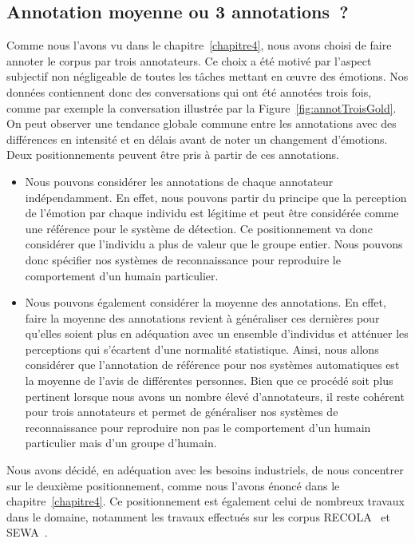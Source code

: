 \subsection{Annotation moyenne ou 3 annotations ?}
Comme nous l'avons vu dans le chapitre~\ref{chapitre4}, nous avons choisi de faire annoter le corpus par trois annotateurs. Ce choix a été motivé par l'aspect subjectif non négligeable de toutes les tâches mettant en œuvre des émotions. Nos données contiennent donc des conversations qui ont été annotées trois fois, comme par exemple la conversation illustrée par la Figure~\ref{fig:annotTroisGold}. On peut observer une tendance globale commune entre les annotations avec des différences en intensité et en délais avant de noter un changement d'émotions. Deux positionnements peuvent être pris à partir de ces annotations.



\begin{itemize}
  \item Nous pouvons considérer les annotations de chaque annotateur indépendamment. En effet, nous pouvons partir du principe que la perception de l'émotion par chaque individu est légitime et peut être considérée comme une référence pour le système de détection.
  Ce positionnement va donc considérer que l'individu a plus de valeur que le groupe entier. Nous pouvons donc spécifier nos systèmes de reconnaissance pour reproduire le comportement d'un humain particulier.
  \item Nous pouvons également considérer la moyenne des annotations. En effet, faire la moyenne des annotations revient à généraliser ces dernières pour qu'elles soient plus en adéquation avec un ensemble d'individus et atténuer les perceptions qui s'écartent d'une normalité statistique. Ainsi, nous allons considérer que l'annotation de référence pour nos systèmes automatiques est la moyenne de l'avis de différentes personnes. Bien que ce procédé soit plus pertinent lorsque nous avons un nombre élevé d'annotateurs, il reste cohérent pour trois annotateurs et permet de généraliser nos systèmes de reconnaissance pour reproduire non pas le comportement d'un humain particulier mais d'un groupe d'humain.
\end{itemize}

Nous avons décidé, en adéquation avec les besoins industriels, de nous concentrer sur le deuxième positionnement, comme nous l'avons énoncé dans le chapitre~\ref{chapitre4}. Ce positionnement est également celui de nombreux travaux dans le domaine, notamment les travaux effectués sur les corpus RECOLA~\cite{Ringeval2013} et SEWA~\cite{SEWA}.


